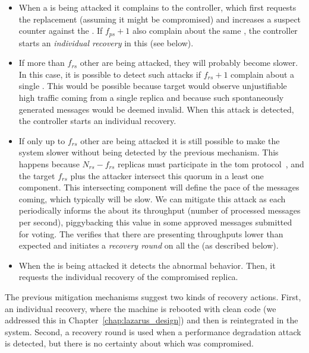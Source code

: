 \begin{itemize}

\item When a \presieve is being attacked it complains to the controller, which first requests the \presieve replacement (assuming it might be compromised) and increases a suspect counter against the \repsieve.
If $f_{ps}+1$ \presieves also complain about the same \repsieve, the controller starts an \emph{individual recovery} in this \repsieve (see below).

\item If more than $f_{rs}$ other \repsieves are being attacked, they will probably become slower.
In this case, it is possible to detect such attacks if $f_{rs}+1$ \repsieves complain about a single \repsieve.
This would be possible because target \repsieves would observe unjustifiable high traffic coming from a single replica and because such spontaneously generated messages would be deemed invalid.
When this attack is detected, the controller starts an individual \repsieve recovery.

\item If only up to $f_{rs}$ other \repsieves are being attacked it is still possible to make the system slower without being detected by the previous mechanism.
This happens because $N_{rs}-f_{rs}$ replicas must participate in the \gls{tom} protocol~\cite{Bessani:2014}, and the target $f_{rs}$ plus the attacker intersect this quorum in a least one component. 
This intersecting component will define the pace of the messages coming, which typically will be slow.
We can mitigate this attack as each \repsieve periodically informs the \postsieve about its throughput (number of processed messages per second), piggybacking this value in some approved messages submitted for voting.
The \postsieve verifies that there are \repsieves presenting throughputs lower than expected and initiates a \emph{recovery round} on all the \repsieves (as described below).

\item When the \postsieve is being attacked it detects the abnormal behavior.
Then, it requests the individual recovery of the compromised replica.

\end{itemize}

The previous mitigation mechanisms suggest two kinds of recovery actions.
First, an individual recovery, where the machine is rebooted with clean code (we addressed this in Chapter~\ref{chap:lazarus_design}) and then is reintegrated in the system.
Second, a recovery round is used when a performance degradation attack is detected, but there is no certainty about which \repsieve was compromised.

